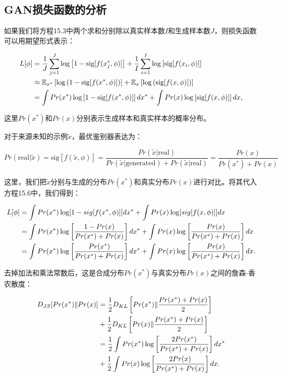 \documentclass[lang=cn,newtx,10pt,scheme=chinese]{elegantbook}
\begin{document}
\subsection{GAN损失函数的分析}
如果我们将方程15.3中两个求和分别除以真实样本数\(I\)和生成样本数\(J\)，则损失函数可以用期望形式表示：


\begin{align}
L[\phi] &= \frac{1}{J} \sum_{j=1}^{J} \log \left[ 1 - \text{sig}[f(x_j^*, \phi)] \right] + \frac{1}{I} \sum_{i=1}^{I} \log \left[ \text{sig}[f(x_i, \phi)] \right] \notag \\
&\approx \mathbb{E}_{x^*} \left[ \log \left( 1 - \text{sig}[f(x^*, \phi)] \right) \right] + \mathbb{E}_{x} \left[ \log \left( \text{sig}[f(x, \phi)] \right) \right] \notag \\
&= \int Pr(x^*) \log \left[ 1 - \text{sig}[f(x^*, \phi)] \right] dx^* + \int Pr(x) \log \left[ \text{sig}[f(x, \phi)] \right] dx, 
\end{align} 


这里\(Pr(x^*)\)和\(Pr(x)\)分别表示生成样本和真实样本的概率分布。

对于来源未知的示例\(\tilde{x}\)，最优鉴别器表达为：

\begin{equation}
Pr(\text{real}|\tilde{x}) = \text{sig}[f(\tilde{x}, \phi)] = \frac{Pr(\tilde{x}|\text{real})}{Pr(\tilde{x}|\text{generated}) + Pr(\tilde{x}|\text{real})} = \frac{Pr(x)}{Pr(x^*) + Pr(x)} 
\end{equation}

这里，我们把\(\tilde{x}\)分别与生成的分布\(Pr(x^*)\)和真实分布\(Pr(x)\)进行对比。将其代入方程15.6中，我们得到：


\begin{align}
L[\phi] &= \int Pr(x^*) \log [1 - sig[f(x^*, \phi)]] dx^* + \int Pr(x) \log [sig[f(x, \phi)]] dx \notag\\
&= \int Pr(x^*) \log \left[ \frac{1 - Pr(x)}{Pr(x^*) + Pr(x)} \right] dx^* + \int Pr(x) \log \left[ \frac{Pr(x)}{Pr(x^*) + Pr(x)} \right] dx \notag \\
&= \int Pr(x^*) \log \left[ \frac{Pr(x^*)}{Pr(x^*) + Pr(x)} \right] dx^* + \int Pr(x) \log \left[ \frac{Pr(x)}{Pr(x^*) + Pr(x)} \right] dx. 
\end{align} 



去掉加法和乘法常数后，这是合成分布\(Pr(x^*)\)与真实分布\(Pr(x)\)之间的詹森-香农散度：


\begin{align}
D_{JS} [ Pr(x^*) \| Pr(x) ] &= \frac{1}{2} D_{KL} \left[ Pr(x^*) \| \frac{Pr(x^*) + Pr(x)}{2} \right] \notag \\
&+ \frac{1}{2} D_{KL} \left[ Pr(x) \| \frac{Pr(x^*) + Pr(x)}{2} \right] \notag \\
&= \frac{1}{2} \int Pr(x^*) \log \left[ \frac{2Pr(x^*)}{Pr(x^*) + Pr(x)} \right] dx^* \notag \\
&+ \frac{1}{2} \int Pr(x) \log \left[ \frac{2Pr(x)}{Pr(x^*) + Pr(x)} \right] dx. 
\end{align} 
\end{document}
